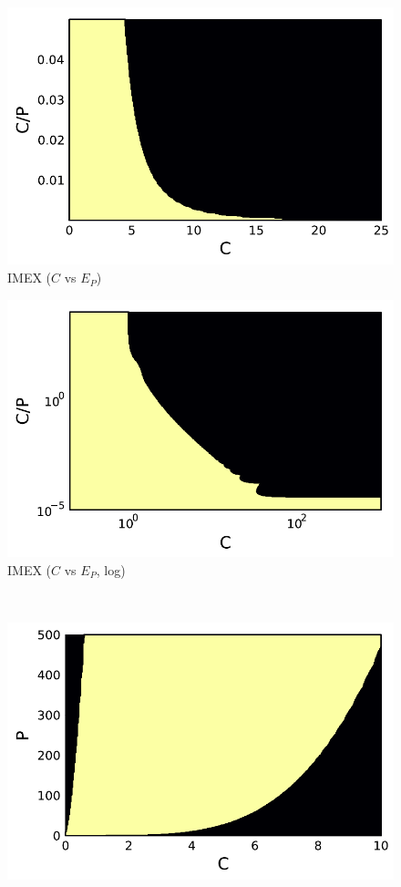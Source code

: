 \begin{example}
\begin{figure}
\begin{minipage}[t]{0.32\textwidth}
			\includegraphics[width=\textwidth]{pdf/pdepics/disp/contourf_adv_disp_IMEXDeC_gaussLobatto_2_disp_Shu_adv_1_CE.pdf}
			IMEX  ($C$ vs $E_P$)
		\end{minipage}
		\begin{minipage}[t]{0.32\textwidth}
			\centering
			\includegraphics[width=\textwidth]{pdf/pdepics/disp/contourf_adv_disp_IMEXDeC_gaussLobatto_2_disp_Shu_adv_1_CE_higher.pdf}
			IMEX  ($C$ vs $E_P$, log)
		\end{minipage}\\
		\begin{minipage}[t]{0.32\textwidth}
			\centering
			\includegraphics[width=\textwidth]{pdf/pdepics/disp/contourf_adv_disp_IMEXDeC_equispaced_3_disp_Shu_adv_1_CP_long.pdf}

\end{minipage}
\end{figure}
\end{example}
